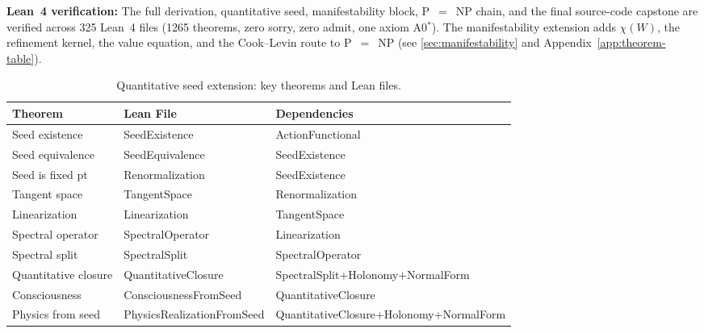 \textbf{Lean~4 verification:} The full derivation, quantitative seed,
manifestability block, P~$=$~NP chain, and the final source-code
capstone are verified across 325 Lean~4 files (1265 theorems, zero sorry,
zero admit, one axiom A0$^*$).  The manifestability
extension adds $\chi(W)$, the refinement kernel, the value equation,
and the Cook--Levin route to P~$=$~NP
(see \cref{sec:manifestability} and Appendix~\ref{app:theorem-table}).

\begin{table}[t]
\centering
\small
\caption{Quantitative seed extension: key theorems and Lean files.}
\label{tab:seed-theorems}
\begin{tabular}{@{}lll@{}}
\toprule
\textbf{Theorem} & \textbf{Lean File} & \textbf{Dependencies} \\
\midrule
Seed existence    & SeedExistence      & ActionFunctional \\
Seed equivalence  & SeedEquivalence    & SeedExistence \\
Seed is fixed pt  & Renormalization    & SeedExistence \\
Tangent space     & TangentSpace       & Renormalization \\
Linearization     & Linearization      & TangentSpace \\
Spectral operator & SpectralOperator   & Linearization \\
Spectral split    & SpectralSplit      & SpectralOperator \\
Quantitative closure & QuantitativeClosure & SpectralSplit+Holonomy+NormalForm \\
Consciousness     & ConsciousnessFromSeed & QuantitativeClosure \\
Physics from seed & PhysicsRealizationFromSeed & QuantitativeClosure+Holonomy+NormalForm \\
\bottomrule
\end{tabular}
\end{table}
